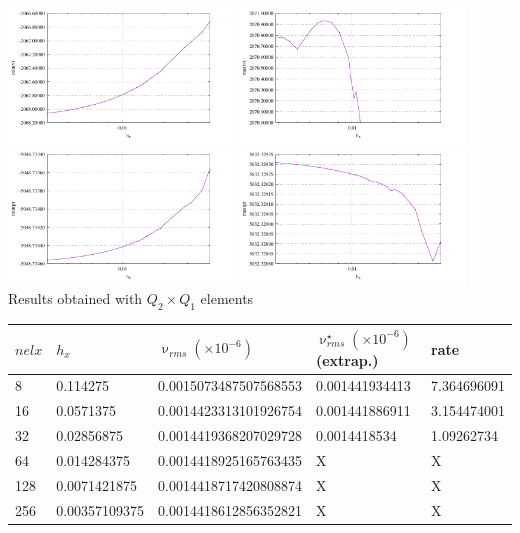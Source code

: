 \begin{center}
\includegraphics[width=6cm]{python_codes/fieldstone_25/results/min_v_001.pdf}
\includegraphics[width=6cm]{python_codes/fieldstone_25/results/max_v_001.pdf}\\
\includegraphics[width=6cm]{python_codes/fieldstone_25/results/min_p_001.pdf}
\includegraphics[width=6cm]{python_codes/fieldstone_25/results/max_p_001.pdf}\\
{\captionfont Results obtained with $Q_2\times Q_1$ elements} 
\end{center}

\begin{tabular}{lllll}
\hline
$nelx$ & $h_x$ & $\upnu_{rms}(\times 10^{-6})$ & $\upnu^\star_{rms}(\times 10^{-6})$ (extrap.)  & rate \\
\hline\hline
8    & 0.114275      & 0.0015073487507568553 &  0.001441934413 & 7.364696091 \\
16   & 0.0571375     & 0.0014423313101926754 &  0.001441886911 & 3.154474001 \\
32   & 0.02856875    & 0.0014419368207029728 &  0.0014418534   & 1.09262734 \\
64   & 0.014284375   & 0.0014418925165763435 &  X              & X   \\
128  & 0.0071421875  & 0.0014418717420808874 &  X              & X   \\
256  & 0.00357109375 & 0.0014418612856352821 &  X              & X   \\
\hline
\end{tabular}



